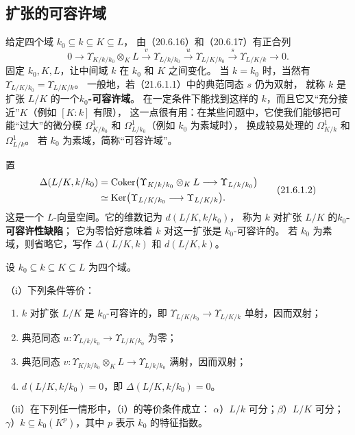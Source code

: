 \subsection{扩张的可容许域}
给定四个域 $k_0\subseteq k\subseteq K\subseteq L$，
由（20.6.16）和（20.6.17）有正合列
\begin{equation}
 0\longrightarrow\Upsilon_{K/k/k_0}\otimes_KL
 \xrightarrow{v}\Upsilon_{L/k/k_0}
 \xrightarrow{u}\Upsilon_{L/K/k_0}
 \xrightarrow{s}\Upsilon_{L/K/k}\longrightarrow0.
 \tag{21.6.1.1}
\end{equation}
固定 $k_0,K,L$，让中间域 $k$ 在 $k_0$ 和 $K$ 之间变化。
当 $k=k_0$ 时，当然有 $\Upsilon_{L/K/k_0}=\Upsilon_{L/K/k}$。
一般地，若（21.6.1.1）中的典范同态 $s$ 仍为双射，
就称 $k$ 是扩张 $L/K$ 的一个\textbf{$k_0$-可容许域}。
在一定条件下能找到这样的 $k$，而且它又“充分接近”$K$（例如 $[K:k]$ 有限），
这一点很有用：在某些问题中，它使我们能够把可能“过大”的微分模
$\Omega^1_{K/k_0}$ 和 $\Omega^1_{L/k_0}$（例如 $k_0$ 为素域时），
换成较易处理的 $\Omega^1_{K/k}$ 和 $\Omega^1_{L/k}$。
若 $k_0$ 为素域，简称“可容许域”。

置
\begin{equation}
\begin{split}
 \Delta(L/K,k/k_0)
 & =\operatorname{Coker}\bigl(\Upsilon_{K/k/k_0}\otimes_KL
                    \longrightarrow\Upsilon_{L/k/k_0}\bigr)\\
 & \simeq\operatorname{Ker}\bigl(\Upsilon_{L/K/k_0}
                    \longrightarrow\Upsilon_{L/K/k}\bigr).
\end{split}
\tag{21.6.1.2}
\end{equation}
这是一个 $L$-向量空间。它的维数记为 $d(L/K,k/k_0)$，
称为 $k$ 对扩张 $L/K$ 的\textbf{$k_0$-可容许性缺陷}；
它为零恰好意味着 $k$ 对这一扩张是 $k_0$-可容许的。
若 $k_0$ 为素域，则省略它，写作 $\Delta(L/K,k)$ 和 $d(L/K,k)$。

设 $k_0\subseteq k\subseteq K\subseteq L$ 为四个域。

（i）下列条件等价：
\begin{enumerate}[label=\alph*),leftmargin=2.5em]
\item $k$ 对扩张 $L/K$ 是 $k_0$-可容许的，即
$\Upsilon_{L/K/k_0}\to\Upsilon_{L/K/k}$ 单射，因而双射；
\item 典范同态 $u:\Upsilon_{L/k/k_0}\to\Upsilon_{L/K/k_0}$ 为零；
\item 典范同态 $v:\Upsilon_{K/k/k_0}\otimes_KL\to\Upsilon_{L/k/k_0}$ 满射，因而双射；
\item $d(L/K,k/k_0)=0$，即 $\Delta(L/K,k/k_0)=0$。
\end{enumerate}
（ii）在下列任一情形中，（i）的等价条件成立：
$\alpha$）$L/k$ 可分；$\beta$）$L/K$ 可分；
$\gamma$）$k\subseteq k_0(K^p)$，其中 $p$ 表示 $k_0$ 的特征指数。

